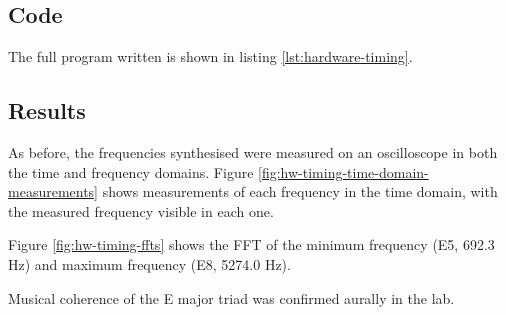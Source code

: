 \documentclass[11pt]{article}
\begin{document}
\subsection{Code}
The full program written is shown in listing \ref{lst:hardware-timing}.



\subsection{Results}

As before, the frequencies synthesised were measured on an oscilloscope in both the time and frequency domains. Figure \ref{fig:hw-timing-time-domain-measurements} shows measurements of each frequency in the time domain, with the measured frequency visible in each one.

Figure \ref{fig:hw-timing-ffts} shows the FFT of the minimum frequency (E5, 692.3 Hz) and maximum frequency (E8, 5274.0 Hz).

Musical coherence of the E major triad was confirmed aurally in the lab.
\end{document}
